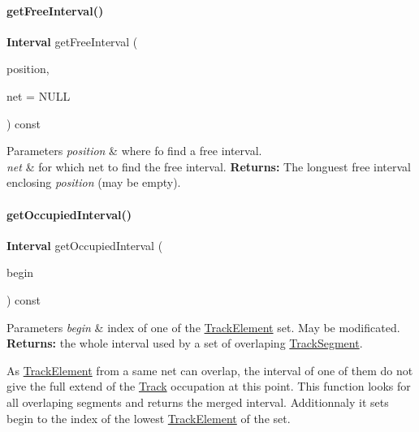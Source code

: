 \paragraph{\texorpdfstring{get\+Free\+Interval()}{getFreeInterval()}}
{\footnotesize\ttfamily \textbf{ Interval} get\+Free\+Interval (\begin{DoxyParamCaption}\item[{\textbf{ Db\+U\+::\+Unit}}]{position,  }\item[{\textbf{ Net} $\ast$}]{net = {\ttfamily NULL} }\end{DoxyParamCaption}) const}


\begin{DoxyParams}{Parameters}
{\em position} & where fo find a free interval. \\
\hline
{\em net} & for which net to find the free interval. {\bfseries Returns\+:} The longuest free interval enclosing {\itshape position} (may be empty). \\
\hline
\end{DoxyParams}
\mbox{\label{classKite_1_1Track_ae87a2e7c9632b60737162295542e3e93}} 
\paragraph{\texorpdfstring{get\+Occupied\+Interval()}{getOccupiedInterval()}}
{\footnotesize\ttfamily \textbf{ Interval} get\+Occupied\+Interval (\begin{DoxyParamCaption}\item[{size\+\_\+t \&}]{begin }\end{DoxyParamCaption}) const}


\begin{DoxyParams}{Parameters}
{\em begin} & index of one of the \hyperlink{classKite_1_1TrackElement}{Track\+Element} set. May be modificated. {\bfseries Returns\+:} the whole interval used by a set of overlaping \hyperlink{classKite_1_1TrackSegment}{Track\+Segment}.\\
\hline
\end{DoxyParams}
As \hyperlink{classKite_1_1TrackElement}{Track\+Element} from a same net can overlap, the interval of one of them do not give the full extend of the \hyperlink{classKite_1_1Track}{Track} occupation at this point. This function looks for all overlaping segments and returns the merged interval. Additionnaly it sets {\ttfamily begin} to the index of the lowest \hyperlink{classKite_1_1TrackElement}{Track\+Element} of the set.

